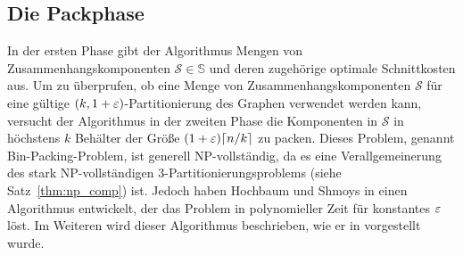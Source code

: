 \subsection{Die Packphase}
In der ersten Phase gibt der Algorithmus Mengen von Zusammenhangskomponenten $\mathcal{S} \in \mathbb{S}$ und deren zugehörige optimale Schnittkosten aus.
Um zu überprufen, ob eine Menge von Zusammenhangskomponenten $\mathcal{S}$ für eine gültige $(k,1+\varepsilon)$-Partitionierung des Graphen verwendet werden kann, versucht der Algorithmus in der zweiten Phase die Komponenten in $\mathcal{S}$ in höchstens $k$ Behälter der Größe $(1 + \eps) \ceil*{n/k}$ zu packen.
Dieses Problem, genannt Bin-Packing-Problem, ist generell NP-vollständig, da es eine Verallgemeinerung des stark NP-vollständigen 3-Partitionierungsproblems (siehe Satz~\ref{thm:np_comp}) ist.
Jedoch haben Hochbaum und Shmoys in \parencite{hs86} einen Algorithmus entwickelt, der das Problem in polynomieller Zeit für konstantes $\varepsilon$ löst.
Im Weiteren wird dieser Algorithmus beschrieben, wie er in \parencite{hs86, va13} vorgestellt wurde.

